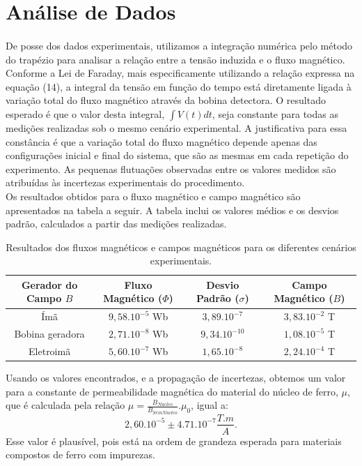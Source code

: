 \documentclass[column,brazilian,12pt,a4paper,final]{article}
\begin{document}
\section{Análise de Dados}
\paragraph{}
De posse dos dados experimentais, utilizamos a integração numérica pelo método do trapézio para analisar a relação entre a tensão induzida e o fluxo magnético. Conforme a Lei de Faraday, mais especificamente utilizando a relação expressa na equação (14), a integral da tensão em função do tempo está diretamente ligada à variação total do fluxo magnético através da bobina detectora. O resultado esperado é que o valor desta integral, $\int V(t)dt$, seja constante para todas as medições realizadas sob o mesmo cenário experimental. A justificativa para essa constância é que a variação total do fluxo magnético depende apenas das configurações inicial e final do sistema, que são as mesmas em cada repetição do experimento. As pequenas flutuações observadas entre os valores medidos são atribuídas às incertezas experimentais do procedimento.\\

Os resultados obtidos para o fluxo magnético e campo magnético são apresentados na tabela a seguir. A tabela inclui os valores médios e os desvios padrão, calculados a partir das medições realizadas.
\begin{table}[H]
    \centering
    \begin{tabular}{|c|c|c|c|}
        \hline
        Gerador do Campo $B$ & Fluxo Magnético ($\Phi$) & Desvio Padrão ($\sigma$)& Campo Magnético ($B$) \\
        \hline
        Ímã & $9,58.10^{-5}$ Wb &  $3,89.10^{-7}$ & $3,83.10^{-2}$ T \\
        Bobina geradora & $2,71.10^{-8}$ Wb & $9,34.10^{-10}$ & $1,08.10^{-5}$ T \\
        Eletroimã & $5,60.10^{-7}$ Wb & $1,65.10^{-8}$ & $2,24.10^{-4}$ T \\
        \hline
    \end{tabular}
    \caption{Resultados dos fluxos magnéticos e campos magnéticos para os diferentes cenários experimentais.}
    \label{tab:resultados_fluxo_campo}
\end{table}

Usando os valores encontrados, e a propagação de incertezas, obtemos um valor para a constante de permeabilidade magnética do material do núcleo de ferro, $\mu$, que é calculada pela relação $\mu = \frac{B_{Nucleo}}{B_{Sem Nucleo}} . \mu_0$, igual a:
\begin{equation}
    2,60.10^{-5} \pm 4.71.10^{-7} \frac{T.m}{A}. 
\end{equation}
Esse valor é plausível, pois está na ordem de grandeza esperada para materiais compostos de ferro com impurezas.
\end{document}
